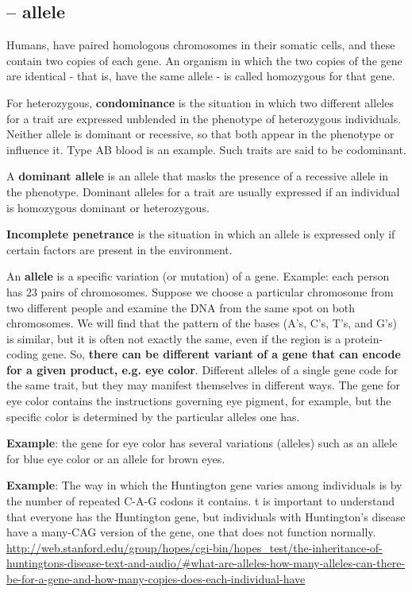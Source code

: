 \subsection{-- allele}
\label{sec:allele}

Humans, have paired homologous chromosomes in their somatic cells, and these
contain two copies of each gene. An organism in which the two copies of the gene
are identical - that is, have the same allele - is called homozygous for that gene. 

For heterozygous, {\bf condominance} is the situation in which two different
alleles for a trait are expressed unblended in the phenotype of heterozygous
individuals.  Neither allele is dominant or recessive, so that both appear in
the phenotype or influence it.  Type AB blood is an example.  Such traits are
said to be codominant.

A {\bf dominant allele} is an allele that masks the presence of a recessive
allele in the phenotype. Dominant alleles for a trait are usually expressed if
an individual is homozygous dominant or heterozygous.

{\bf Incomplete penetrance} is the situation in which an allele is expressed
only if certain factors are present in the environment.



An {\bf allele} is a specific variation (or mutation) of a gene.
Example: each person has 23 pairs of chromosomes.
Suppose we choose a particular chromosome from two different people and examine
the DNA from the same spot on both chromosomes. We will find that the pattern of
the bases (A's, C's, T's, and G's) is similar, but it is often not exactly the
same, even if the region is a protein-coding gene. So, {\bf there can be
different variant of a gene that can encode for a given product, e.g. eye
color}. Different alleles of a single gene code for the same trait, but they may
manifest themselves in different ways. The gene for eye color contains the
instructions governing eye pigment, for example, but the specific color is
determined by the particular alleles one has. 

{\bf Example}: the gene for eye color has several variations (alleles) such as
an allele for blue eye color or an allele for brown eyes.

{\bf Example}: The way in which the Huntington gene varies among individuals is
by the number of repeated C-A-G codons it contains. t is important to understand that
everyone has the Huntington gene, but individuals with Huntington's disease have
a many-CAG version of the gene, one that does not function normally.
\url{http://web.stanford.edu/group/hopes/cgi-bin/hopes_test/the-inheritance-of-huntingtons-disease-text-and-audio/#what-are-alleles-how-many-alleles-can-there-be-for-a-gene-and-how-many-copies-does-each-individual-have}


